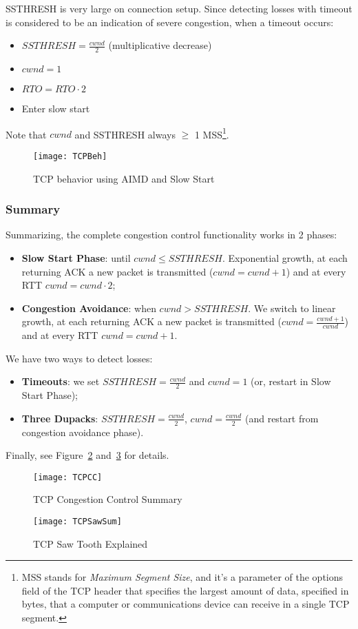 SSTHRESH is very large on connection setup.
Since detecting losses with timeout is considered to be an indication 
of severe congestion, when a timeout occurs:	
\begin{itemize}
  \item $SSTHRESH = \frac{cwnd}{2}$ (multiplicative decrease)
  \item $cwnd=1$
  \item $RTO=RTO \cdot 2$
  \item Enter slow start
\end{itemize}

Note that $cwnd$ and SSTHRESH always $\ge$ 1 MSS\footnote{
MSS stands for \textit{Maximum Segment Size}, and it's a parameter of the
options field of the TCP header that specifies the largest amount of data,
specified in bytes, that a computer or communications device can receive in a
single TCP segment.
}. 

\begin{figure}[t]
  \centering
  \texttt{[image: TCPBeh]}
  \caption{TCP behavior using AIMD and Slow Start}			
  \label{fig:tcp:TCPBeh}
\end{figure}

\subsubsection{Summary}	
	Summarizing, the complete congestion control functionality works in 2 
phases:
\begin{itemize}
  \item \textbf{Slow Start Phase}: until $cwnd \le SSTHRESH$.
Exponential growth, at each returning ACK a new packet is transmitted 
($cwnd=cwnd+1$) and at every RTT $cwnd=cwnd \cdot 2$; 
  \item \textbf{Congestion Avoidance}: when $cwnd > SSTHRESH$. We 
switch to linear growth, at each returning ACK a new packet is transmitted 
($cwnd=\frac{cwnd+1}{cwnd}$) and at every RTT $cwnd=cwnd+1$.
\end{itemize}
	
We have two ways to detect losses: 
\begin{itemize}
  \item \textbf{Timeouts}: we set $SSTHRESH=\frac{cwnd}{2}$ and $cwnd=1$
(or, restart in Slow Start Phase);
  \item \textbf{Three Dupacks}: $SSTHRESH=\frac{cwnd}{2}$, $cwnd=\frac{cwnd}{2}$
(and restart from congestion avoidance phase).		 
\end{itemize}
	
Finally, see Figure~\ref{fig:tcp:TCPCC} and~\ref{fig:tcp:TCPSawSum} for details.
	
\begin{figure}[t]
  \centering
  \texttt{[image: TCPCC]}
  \caption{TCP Congestion Control Summary}
  \label{fig:tcp:TCPCC}
\end{figure}

\begin{figure}[t]
  \centering
  \texttt{[image: TCPSawSum]}
  \caption{TCP Saw Tooth Explained}
  \label{fig:tcp:TCPSawSum}
\end{figure}
